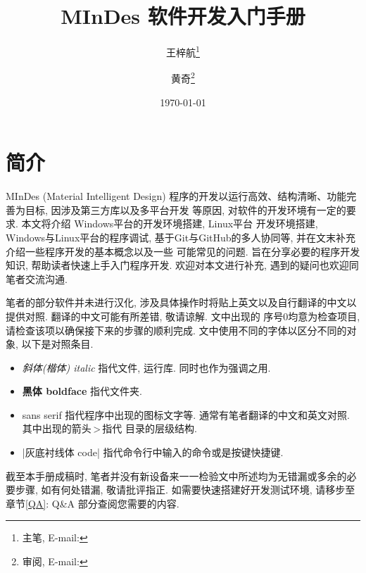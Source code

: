 \title{MInDes 软件开发入门手册}
\author{
    王梓航\thanks{主笔, E-mail: }
    \and 黄奇\thanks{审阅, E-mail: }
}
\date{\today}
\maketitle
\tableofcontents
\newpage

\section{简介}\label{Intro}
MInDes (Material Intelligent Design) 程序的开发以运行高效、结构清晰、功能完善为目标, 因涉及第三方库以及多平台开发
等原因, 对软件的开发环境有一定的要求. 本文将介绍 Windows平台的开发环境搭建, Linux平台
开发环境搭建, Windows与Linux平台的程序调试, 基于Git与GitHub的多人协同等, 并在文末补充介绍一些程序开发的基本概念以及一些
可能常见的问题. 旨在分享必要的程序开发知识, 帮助读者快速上手入门程序开发. 欢迎对本文进行补充, 遇到的疑问也欢迎同笔者交流沟通.

笔者的部分软件并未进行汉化, 涉及具体操作时将贴上英文以及自行翻译的中文以提供对照. 翻译的中文可能有所差错, 敬请谅解. 文中出现的
序号0均意为检查项目, 请检查该项以确保接下来的步骤的顺利完成. 文中使用不同的字体以区分不同的对象, 以下是对照条目.
\begin{itemize}
    \item \emph{斜体(楷体) italic} 指代文件, 运行库. 同时也作为强调之用.
    \item \textbf{黑体 boldface} 指代文件夹.
    \item { sans serif} 指代程序中出现的图标文字等. 通常有笔者翻译的中文和英文对照. 其中出现的箭头{\,\textgreater\,}指代
          目录的层级结构.
    \item \cverb|灰底衬线体 code| 指代命令行中输入的命令或是按键快捷键.
\end{itemize}
截至本手册成稿时, 笔者并没有新设备来一一检验文中所述均为无错漏或多余的必要步骤, 如有何处错漏, 敬请批评指正.
如需要快速搭建好开发测试环境, 请移步至章节\ref{QA}: Q\&A 部分查阅您需要的内容.

\endinput